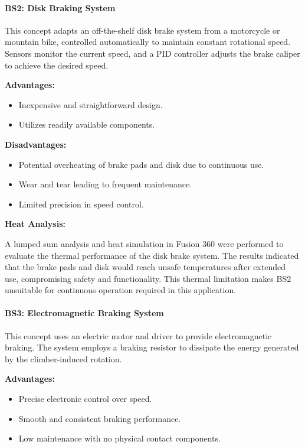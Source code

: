 \paragraph{BS2: Disk Braking System}

This concept adapts an off-the-shelf disk brake system from a motorcycle or mountain bike, controlled automatically to maintain constant rotational speed. Sensors monitor the current speed, and a PID controller adjusts the brake caliper to achieve the desired speed.


\textbf{Advantages:}
\begin{itemize}
    \item Inexpensive and straightforward design.
    \item Utilizes readily available components.
\end{itemize}

\textbf{Disadvantages:}
\begin{itemize}
    \item Potential overheating of brake pads and disk due to continuous use.
    \item Wear and tear leading to frequent maintenance.
    \item Limited precision in speed control.
\end{itemize}

\textbf{Heat Analysis:}

A lumped sum analysis and heat simulation in Fusion 360 were performed to evaluate the thermal performance of the disk brake system. The results indicated that the brake pads and disk would reach unsafe temperatures after extended use, compromising safety and functionality. This thermal limitation makes BS2 unsuitable for continuous operation required in this application.

\paragraph{BS3: Electromagnetic Braking System}

This concept uses an electric motor and driver to provide electromagnetic braking. The system employs a braking resistor to dissipate the energy generated by the climber-induced rotation.


\textbf{Advantages:}
\begin{itemize}
    \item Precise electronic control over speed.
    \item Smooth and consistent braking performance.
    \item Low maintenance with no physical contact components.
\end{itemize}

